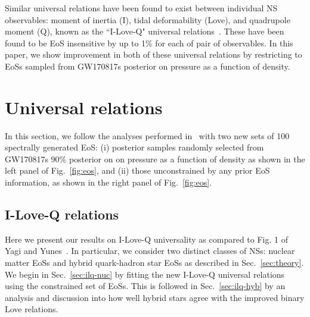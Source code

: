 \documentclass[prd,twocolumn,nofootinbib,superscriptaddress,amsmath,amssymb]{revtex4-1}
\begin{document}
Similar universal relations have been found to exist between individual NS observables: moment of inertia (I), tidal deformability (Love), and quadrupole moment (Q), known as the ``I-Love-Q" universal relations~\cite{Yagi:ILQ}.
These have been found to be EoS insensitive by up to 1\% for each of pair of observables.
In this paper, we show improvement in both of these universal relations by restricting to EoSs sampled from GW170817s posterior on pressure as a function of density.
\section{Universal relations}\label{sec:universal}
In this section, we follow the analyses performed in~\cite{Yagi:binLove,Yagi:ILQ} with two new sets of 100 spectrally generated EoS: (i) posterior samples randomly selected from GW170817s 90\% posterior on on pressure as a function of density as shown in the left panel of Fig.~\ref{fig:eos}, and (ii) those unconstrained by any prior EoS information, as shown in the right panel of Fig.~\ref{fig:eos}.

\subsection{I-Love-Q relations}\label{sec:ilq}
Here we present our results on I-Love-Q universality as compared to Fig. 1 of Yagi and Yunes~\cite{Yagi:ILQ}.
In particular, we consider two distinct classes of NSs: nuclear matter EoSs and hybrid quark-hadron star EoSs as described in Sec.~\ref{sec:theory}.
We begin in Sec.~\ref{sec:ilq-nuc} by fitting the new I-Love-Q universal relations using the constrained set of EoSs.
This is followed in Sec.~\ref{sec:ilq-hyb} by an analysis and discussion into how well hybrid stars agree with the improved binary Love relations. 
\end{document}
